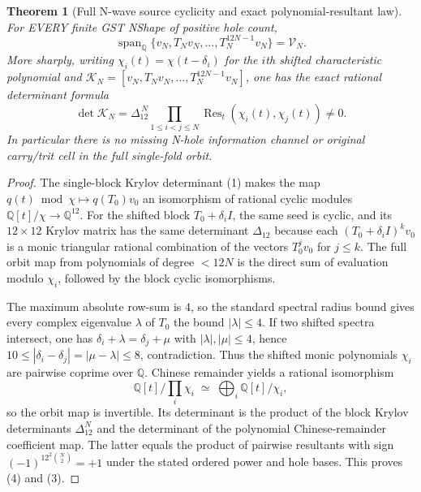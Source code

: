 \documentclass[11pt]{article}
\newtheorem{theorem}{Theorem}
\newcommand{\Q}{\mathbb Q}
\newcommand{\Res}{\operatorname{Res}}
\newcommand{\Span}{\operatorname{span}}
\begin{document}
\begin{theorem}[Full N-wave source cyclicity and exact polynomial-resultant law]
For EVERY finite GST NShape of positive hole count,
\[
 \boxed{\Span_\Q\{v_N,T_Nv_N,\ldots,T_N^{12N-1}v_N\}=\mathscr V_N.}\tag{3}
\]
More sharply, writing
\(\chi_i(t)=\chi(t-\delta_i)\)
for the $i$th shifted characteristic polynomial and
\(\mathcal K_N=[v_N,T_Nv_N,\ldots,T_N^{12N-1}v_N]\), one has the \emph{exact rational determinant formula}
\[
 \boxed{
 \det\mathcal K_N=
 \Delta_{12}^{\,N}\prod_{1\le i<j\le N}\Res_t(\chi_i(t),\chi_j(t))
 \ne0.}\tag{4}
\]
In particular there is no missing N-hole information channel or original carry/trit cell in the full single-fold orbit.
\end{theorem}
\begin{proof}
The single-block Krylov determinant (1) makes the map
\(q(t)\bmod\chi\longmapsto q(T_0)v_0\)
an isomorphism of rational cyclic modules $\Q[t]/\chi\to\Q^{12}$.
For the shifted block $T_0+\delta_i I$, the same seed is cyclic, and its $12\times12$ Krylov matrix has the same determinant $\Delta_{12}$ because each $(T_0+\delta_i I)^kv_0$ is a monic triangular rational combination of the vectors $T_0^jv_0$ for $j\le k$.
The full orbit map from polynomials of degree $<12N$ is the direct sum of evaluation modulo $\chi_i$, followed by the block cyclic isomorphisms.

The maximum absolute row-sum is $4$, so the standard spectral radius bound gives every complex eigenvalue $\lambda$ of $T_0$ the bound $|\lambda|\le4$. If two shifted spectra intersect, one has $\delta_i+\lambda=\delta_j+\mu$ with $|\lambda|,|\mu|\le4$, hence
\(10\le|\delta_i-\delta_j|=|\mu-\lambda|\le8\), contradiction.
Thus the shifted monic polynomials $\chi_i$ are pairwise coprime over $\Q$. Chinese remainder yields a rational isomorphism
\[
 \Q[t]/\prod_i\chi_i \;\simeq\;\bigoplus_i\Q[t]/\chi_i,
\]
so the orbit map is invertible. Its determinant is the product of the block Krylov determinants $\Delta_{12}^N$ and the determinant of the polynomial Chinese-remainder coefficient map. The latter equals the product of pairwise resultants with sign $(-1)^{12^2\binom N2}=+1$ under the stated ordered power and hole bases. This proves (4) and (3).
\end{proof}
\end{document}
